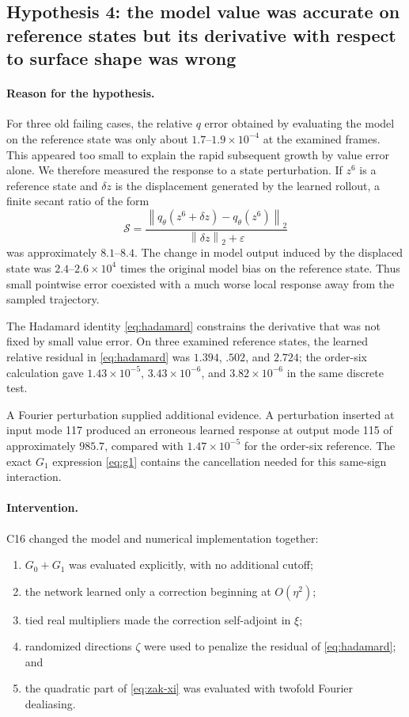 \documentclass[11pt]{article}
\newcommand{\norm}[1]{\left\lVert #1\right\rVert}
\begin{document}
\subsection{Hypothesis 4: the model value was accurate on reference states but
its derivative with respect to surface shape was wrong}

\paragraph{Reason for the hypothesis.}
For three old failing cases, the relative $q$ error obtained by evaluating the
model on the reference state was only about $1.7$--$1.9\times10^{-4}$ at the
examined frames.  This appeared too small to explain the rapid subsequent
growth by value error alone.  We therefore measured the response to a state
perturbation.  If $z^6$ is a reference state and $\delta z$ is the displacement
generated by the learned rollout, a finite secant ratio of the form
\begin{equation}
  \mathcal S
  =\frac{\norm{q_\theta(z^6+\delta z)-q_\theta(z^6)}_2}
  {\norm{\delta z}_2+\varepsilon}
  \label{eq:secant}
\end{equation}
was approximately $8.1$--$8.4$.  The change in model output induced by the
displaced state was $2.4$--$2.6\times10^4$ times the original model bias on the
reference state.  Thus small pointwise error coexisted with a much worse local
response away from the sampled trajectory.

The Hadamard identity \eqref{eq:hadamard} constrains the derivative that was
not fixed by small value error.  On three examined reference states, the learned relative
residual in \eqref{eq:hadamard} was $1.394$, $.502$, and $2.724$; the order-six
calculation gave $1.43\times10^{-5}$, $3.43\times10^{-6}$, and
$3.82\times10^{-6}$ in the same discrete test.

A Fourier perturbation supplied additional evidence.  A perturbation inserted
at input mode 117 produced an erroneous learned response at output mode 115 of
approximately $985.7$, compared with $1.47\times10^{-5}$ for the order-six
reference.  The exact $G_1$ expression \eqref{eq:g1} contains the cancellation
needed for this same-sign interaction.

\paragraph{Intervention.}
C16 changed the model and numerical implementation together:
\begin{enumerate}[leftmargin=*]
  \item $G_0+G_1$ was evaluated explicitly, with no additional cutoff;
  \item the network learned only a correction beginning at $O(\eta^2)$;
  \item tied real multipliers made the correction self-adjoint in $\xi$;
  \item randomized directions $\zeta$ were used to penalize the residual of
        \eqref{eq:hadamard}; and
  \item the quadratic part of \eqref{eq:zak-xi} was evaluated with twofold
        Fourier dealiasing.
\end{enumerate}
\end{document}
